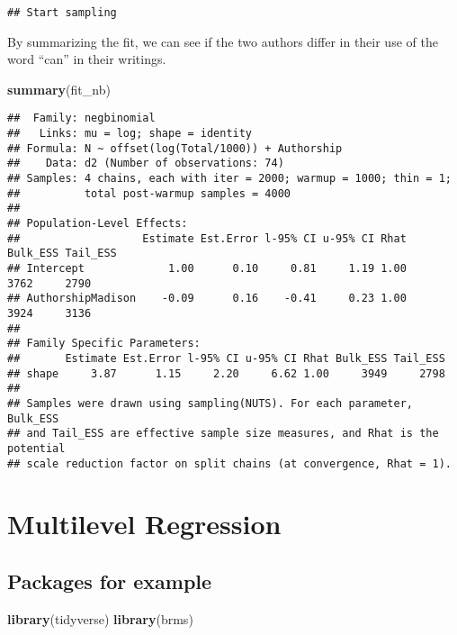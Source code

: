 \documentclass[
]{book}
\newenvironment{Shaded}{\begin{snugshade}}{\end{snugshade}}
\newcommand{\KeywordTok}[1]{\textcolor[rgb]{0.13,0.29,0.53}{\textbf{#1}}}
\newcommand{\NormalTok}[1]{#1}
\begin{document}
\begin{verbatim}
## Start sampling
\end{verbatim}

By summarizing the fit, we can see if the two authors differ in their use of the word ``can'' in their writings.

\begin{Shaded}
\begin{Highlighting}[]
\KeywordTok{summary}\NormalTok{(fit_nb)}
\end{Highlighting}
\end{Shaded}

\begin{verbatim}
##  Family: negbinomial 
##   Links: mu = log; shape = identity 
## Formula: N ~ offset(log(Total/1000)) + Authorship 
##    Data: d2 (Number of observations: 74) 
## Samples: 4 chains, each with iter = 2000; warmup = 1000; thin = 1;
##          total post-warmup samples = 4000
## 
## Population-Level Effects: 
##                   Estimate Est.Error l-95% CI u-95% CI Rhat Bulk_ESS Tail_ESS
## Intercept             1.00      0.10     0.81     1.19 1.00     3762     2790
## AuthorshipMadison    -0.09      0.16    -0.41     0.23 1.00     3924     3136
## 
## Family Specific Parameters: 
##       Estimate Est.Error l-95% CI u-95% CI Rhat Bulk_ESS Tail_ESS
## shape     3.87      1.15     2.20     6.62 1.00     3949     2798
## 
## Samples were drawn using sampling(NUTS). For each parameter, Bulk_ESS
## and Tail_ESS are effective sample size measures, and Rhat is the potential
## scale reduction factor on split chains (at convergence, Rhat = 1).
\end{verbatim}

\hypertarget{multilevel-regression}{%
\chapter{Multilevel Regression}\label{multilevel-regression}}

\hypertarget{packages-for-example}{%
\section{Packages for example}\label{packages-for-example}}

\begin{Shaded}
\begin{Highlighting}[]
\KeywordTok{library}\NormalTok{(tidyverse)}
\KeywordTok{library}\NormalTok{(brms)}
\end{Highlighting}
\end{Shaded}
\end{document}

